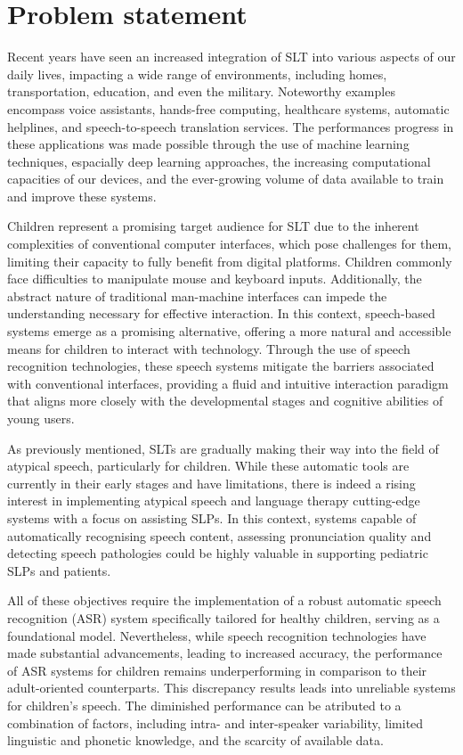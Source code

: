 \section{Problem statement}
Recent years have seen an increased integration of SLT into various aspects of our daily lives, impacting a wide range of environments, including homes, transportation, education, and even the military. Noteworthy examples encompass voice assistants, hands-free computing, healthcare systems, automatic helplines, and speech-to-speech translation services. The performances progress in these applications was made possible through the use of machine learning techniques, espacially deep learning approaches, the increasing computational capacities of our devices, and the ever-growing volume of data available to train and improve these systems.

Children represent a promising target audience for SLT due to the inherent complexities of conventional computer interfaces, which pose challenges for them, limiting their capacity to fully benefit from digital platforms. Children commonly face difficulties to manipulate mouse and keyboard inputs. Additionally, the abstract nature of traditional man-machine interfaces can impede the understanding necessary for effective interaction. In this context, speech-based systems emerge as a promising alternative, offering a more natural and accessible means for children to interact with technology. Through the use of speech recognition technologies, these speech systems mitigate the barriers associated with conventional interfaces, providing a fluid and intuitive interaction paradigm that aligns more closely with the developmental stages and cognitive abilities of young users.

As previously mentioned, SLTs are gradually making their way into the field of atypical speech, particularly for children. While these automatic tools are currently in their early stages and have limitations, there is indeed a rising interest in implementing atypical speech and language therapy cutting-edge systems with a focus on assisting SLPs. In this context, systems capable of automatically recognising speech content, assessing pronunciation quality and detecting speech pathologies could be highly valuable in supporting pediatric SLPs and patients.

All of these objectives require the implementation of a robust automatic speech recognition (ASR) system specifically tailored for healthy children, serving as a foundational model. Nevertheless, while speech recognition technologies have made substantial advancements, leading to increased accuracy, the performance of ASR systems for children remains underperforming in comparison to their adult-oriented counterparts. This discrepancy results leads into unreliable systems for children's speech. The diminished performance can be atributed to a combination of factors, including intra- and inter-speaker variability, limited linguistic and phonetic knowledge, and the scarcity of available data.

